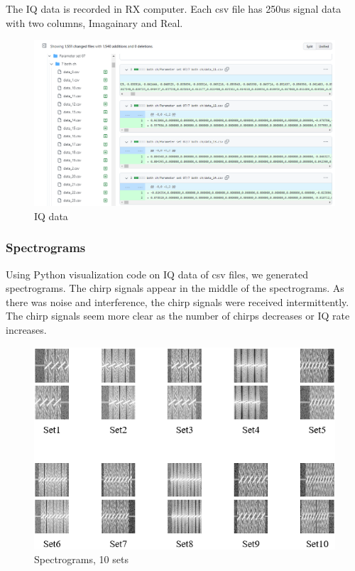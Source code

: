     
    The IQ data is recorded in RX computer. Each csv file has 250us signal data with two columns, Imagainary and Real. \\
    \vspace{-4mm}  
    \begin{figure}[!h]\raggedleft
    \hspace{15mm}
		\includegraphics[width=.95\textwidth]{image/week04/1-1-a.png}
		\caption{\footnotesize IQ data}
		\vspace{-10pt}
    \end{figure}
    
\clearpage 
    \subsubsection*{Spectrograms}
    Using Python visualization code on IQ data of csv files, we generated spectrograms. The chirp signals appear in the middle of the spectrograms. As there was noise and interference, the chirp signals were received intermittently. The chirp signals seem more clear as the number of chirps decreases or IQ rate increases. \\
    \vspace{-4mm}  
    \begin{figure}[!h]\raggedleft
    \hspace{15mm}
		\includegraphics[width=.95\textwidth]{image/week04/1-1-1.png}
		\caption{\footnotesize Spectrograms, 10 sets}
		\vspace{-10pt}
    \end{figure}
    

